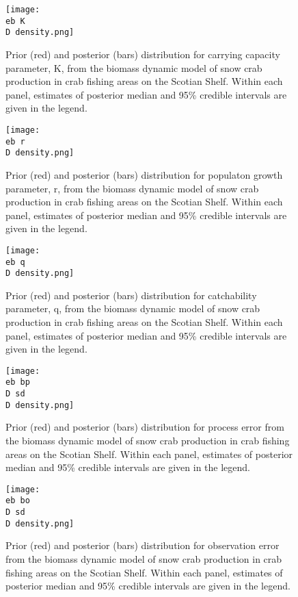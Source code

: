 \documentclass[11pt]{article}
\newcommand{\D}{.}
\newcommand{\eb}{ecomod/snowcrab/assessments/2014/figures/bugs/survey/}
\begin{document}
\begin{figure}
    
    \texttt{[image: \\eb K\\D density.png]}
    \caption{Prior (red) and posterior (bars) distribution for carrying capacity parameter, K, from the biomass dynamic model of snow crab production in crab fishing areas on the Scotian Shelf. Within each panel, estimates of posterior median and 95\% credible intervals are given in the legend.}
  
\end{figure}
\clearpage

\begin{figure}
    
    \texttt{[image: \\eb r\\D density.png]}
    \caption{Prior (red) and posterior (bars) distribution for populaton growth parameter, r, from the biomass dynamic model of snow crab production in crab fishing areas on the Scotian Shelf. Within each panel, estimates of posterior median and 95\% credible intervals are given in the legend.}
  
\end{figure}
\clearpage

\begin{figure}
    
    \texttt{[image: \\eb q\\D density.png]}
    \caption{Prior (red) and posterior (bars) distribution for catchability parameter, q, from the biomass dynamic model of snow crab production in crab fishing areas on the Scotian Shelf. Within each panel, estimates of posterior median and 95\% credible intervals are given in the legend.}
  
\end{figure}
\clearpage



\begin{figure}
    
    \texttt{[image: \\eb bp\\D sd\\D density.png]}
    \caption{Prior (red) and posterior (bars) distribution for process error from the biomass dynamic model of snow crab production in crab fishing areas on the Scotian Shelf. Within each panel, estimates of posterior median and 95\% credible intervals are given in the legend.}
  
\end{figure}
\clearpage

\begin{figure}
    
    \texttt{[image: \\eb bo\\D sd\\D density.png]}
    \caption{Prior (red) and posterior (bars) distribution for observation error from the biomass dynamic model of snow crab production in crab fishing areas on the Scotian Shelf. Within each panel, estimates of posterior median and 95\% credible intervals are given in the legend.}
  
\end{figure}
\clearpage
\end{document}
